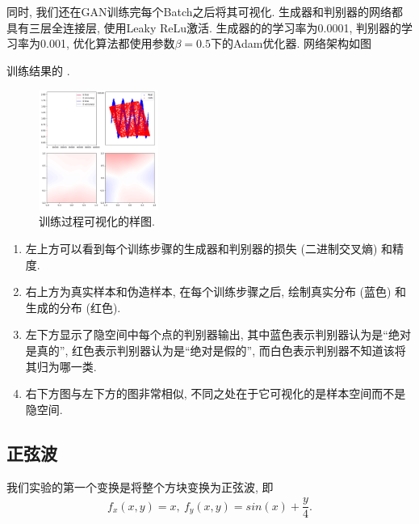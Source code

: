 \documentclass[lang=cn,11pt]{elegantpaper}
\begin{document}
同时, 我们还在GAN训练完每个Batch之后将其可视化. 生成器和判别器的网络都具有三层全连接层, 使用Leaky ReLu激活. 生成器的的学习率为0.0001, 判别器的学习率为0.001, 优化算法都使用参数$\beta=0.5$下的Adam优化器. 网络架构如图%


训练结果的 . 
\begin{figure}[htbp]
  \centering
    \includegraphics[width=0.35\textwidth]{sin_2_1}
    \caption{训练过程可视化的样图. \label{fig:f1}}
  \end{figure}

\begin{enumerate}
	\item 左上方可以看到每个训练步骤的生成器和判别器的损失 (二进制交叉熵) 和精度.
	\item 右上方为真实样本和伪造样本, 在每个训练步骤之后, 绘制真实分布 (蓝色) 和生成的分布 (红色).
	\item 左下方显示了隐空间中每个点的判别器输出, 其中蓝色表示判别器认为是“绝对是真的”, 红色表示判别器认为是“绝对是假的”, 而白色表示判别器不知道该将其归为哪一类. 
	\item 右下方图与左下方的图非常相似, 不同之处在于它可视化的是样本空间而不是隐空间. 
\end{enumerate}

\subsection{正弦波}

我们实验的第一个变换是将整个方块变换为正弦波, 即
\begin{align*}
	f_x(x,y)=x,\ f_y(x,y)=sin(x)+\dfrac{y}{4}.
\end{align*}
\end{document}
